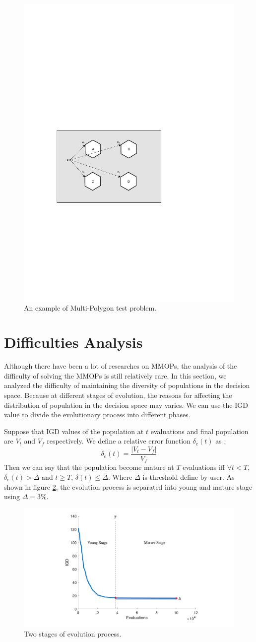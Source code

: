 \documentclass[conference]{IEEEtran}
\begin{document}
\begin{figure}[htbp]
	\centering
	\includegraphics[width=.3\textwidth]{Section2/Problem}
	\caption{An example of Multi-Polygon test problem.}
	\label{fig:Multi-Polygon Problem}
\end{figure}

\section{Difficulties Analysis}
\label{Difficulties Analysis}
Although there have been a lot of researches on MMOPs, the analysis of the difficulty of solving the MMOPs is still relatively rare. In this section, we analyzed the difficulty of  maintaining the diversity of populations in the decision space. Because at different stages of evolution, the reasons for affecting the distribution of population in the decision space may varies. We can use the IGD value to divide the evolutionary process into different phases.

Suppose that IGD values of the population at $t$ evaluations and final population are $V_t$ and $V_f$ respectively. We define a relative error function $\delta_e(t)$ as :
$$\delta_e(t)=\frac{|V_t-V_f|}{V_f}$$
Then we can say that the population become mature at $T$ evaluations iff $\forall t<T$, $\delta_e(t)>\Delta$ and $t \ge T$, $\delta(t) \leq \Delta$. Where $\Delta$ is threshold define by user. As shown in figure \ref{fig: Two stages}, the evolution process is separated into young and mature stage using $\Delta=3\%$.
\begin{figure}[htbp]
    \centering
    \includegraphics[width=.35\textwidth]{Section3/Stages}
    \caption{Two stages of evolution process.}
    \label{fig: Two stages}
\end{figure}
\end{document}
